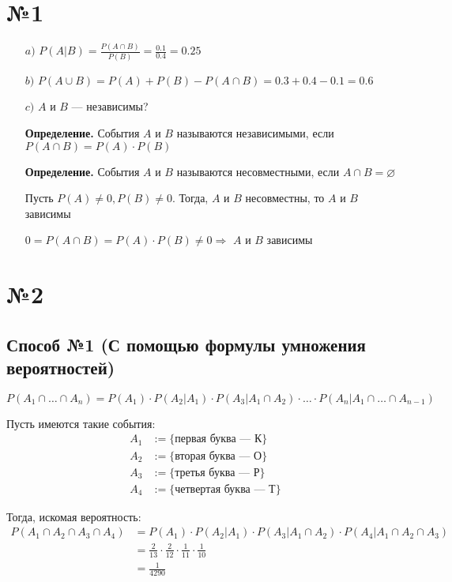 \documentclass[a4paper, 10pt]{article}
\newcommand{\definition}{\textbf{Определение. }}
\begin{document}
\section*{№1}
\begin{enumerate}
    \item[$a)$]$P(A|B)=\displaystyle\frac{P(A\cap B)}{P(B)}=\frac{0.1}{0.4}=0.25$
    \item[$b)$] $P(A\cup B)=P(A)+P(B)-P(A\cap B)=0.3+0.4-0.1=0.6$
    \item[$c)$] $A$ и $B$ — независимы?

    \definition События $A$ и $B$ называются независимыми, если $P(A\cap B)=P(A)\cdot P(B)$

    \definition События $A$ и $B$ называются несовместными, если $A\cap B=\varnothing$

    Пусть $P(A)\ne0,P(B)\ne0$. Тогда, $A$ и $B$ несовместны, то $A$ и $B$ зависимы

    $0=P(A\cap B)=P(A)\cdot P(B)\ne0\Longrightarrow$ $A$ и $B$ зависимы
\end{enumerate}

\section*{№2}
\subsection*{Способ №1 (С помощью формулы умножения вероятностей)}
$P(A_1\cap \ldots \cap A_n)=P(A_1)\cdot P(A_2|A_1)\cdot P(A_3|A_1\cap A_2)\cdot\ldots\cdot P(A_n|A_1\cap\ldots\cap A_{n-1})$

Пусть имеются такие события: \begin{equation*}
    \begin{aligned}
        A_1&:=\{\text{первая буква — К}\}\\
        A_2&:=\{\text{вторая буква — О}\}\\
        A_3&:=\{\text{третья буква — Р}\}\\
        A_4&:=\{\text{четвертая буква — Т}\}
    \end{aligned}
\end{equation*}

Тогда, искомая вероятность:
\begin{equation*}
\begin{aligned}
    P(A_1\cap A_2\cap A_3\cap A_4)&=P(A_1)\cdot P(A_2|A_1)\cdot P(A_3|A_1\cap A_2)\cdot P(A_4|A_1\cap A_2\cap A_3)\\
    &=\frac{2}{13}\cdot\frac{2}{12}\cdot\frac{1}{11}\cdot\frac{1}{10}\\
    &=\frac{1}{4290}
    \end{aligned}
\end{equation*}
\end{document}
